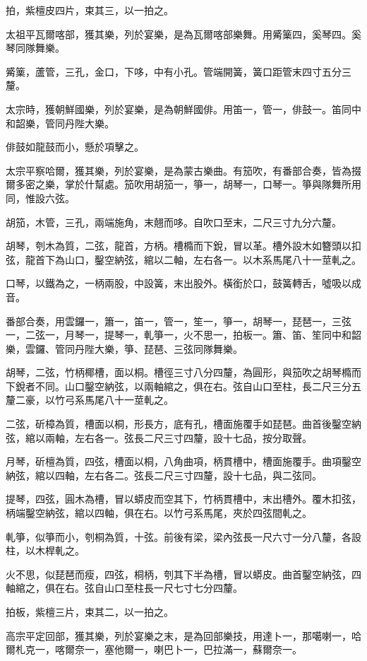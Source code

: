 \begin{pinyinscope}
拍，紫檀皮四片，束其三，以一拍之。

太祖平瓦爾喀部，獲其樂，列於宴樂，是為瓦爾喀部樂舞。用觱篥四，奚琴四。奚琴同隊舞樂。

觱篥，蘆管，三孔，金口，下哆，中有小孔。管端開簧，簧口距管末四寸五分三釐。

太宗時，獲朝鮮國樂，列於宴樂，是為朝鮮國俳。用笛一，管一，俳鼓一。笛同中和韶樂，管同丹陛大樂。

俳鼓如龍鼓而小，懸於項擊之。

太宗平察哈爾，獲其樂，列於宴樂，是為蒙古樂曲。有笳吹，有番部合奏，皆為掇爾多密之樂，掌於什幫處。笳吹用胡笳一，箏一，胡琴一，口琴一。箏與隊舞所用同，惟設六弦。

胡笳，木管，三孔，兩端施角，末翹而哆。自吹口至末，二尺三寸九分六釐。

胡琴，刳木為質，二弦，龍首，方柄。槽橢而下銳，冒以革。槽外設木如簪頭以扣弦，龍首下為山口，鑿空納弦，綰以二軸，左右各一。以木系馬尾八十一莖軋之。

口琴，以鐵為之，一柄兩股，中設簧，末出股外。橫銜於口，鼓簧轉舌，噓吸以成音。

番部合奏，用雲鑼一，簫一，笛一，管一，笙一，箏一，胡琴一，琵琶一，三弦一，二弦一，月琴一，提琴一，軋箏一，火不思一，拍板一。簫、笛、笙同中和韶樂，雲鑼、管同丹陛大樂，箏、琵琶、三弦同隊舞樂。

胡琴，二弦，竹柄椰槽，面以桐。槽徑三寸八分四釐，為圓形，與笳吹之胡琴橢而下銳者不同。山口鑿空納弦，以兩軸綰之，俱在右。弦自山口至柱，長二尺三分五釐二豪，以竹弓系馬尾八十一莖軋之。

二弦，斫樟為質，槽面以桐，形長方，底有孔，槽面施覆手如琵琶。曲首後鑿空納弦，綰以兩軸，左右各一。弦長二尺三寸四釐，設十七品，按分取聲。

月琴，斫檀為質，四弦，槽面以桐，八角曲項，柄貫槽中，槽面施覆手。曲項鑿空納弦，綰以四軸，左右各二。弦長二尺三寸四釐，設十七品，與二弦同。

提琴，四弦，圓木為槽，冒以蟒皮而空其下，竹柄貫槽中，末出槽外。覆木扣弦，柄端鑿空納弦，綰以四軸，俱在右。以竹弓系馬尾，夾於四弦間軋之。

軋箏，似箏而小，刳桐為質，十弦。前後有梁，梁內弦長一尺六寸一分八釐，各設柱，以木桿軋之。

火不思，似琵琶而瘦，四弦，桐柄，刳其下半為槽，冒以蟒皮。曲首鑿空納弦，四軸綰之，俱在右。弦自山口至柱長一尺七寸七分四釐。

拍板，紫檀三片，束其二，以一拍之。

高宗平定回部，獲其樂，列於宴樂之末，是為回部樂技，用達卜一，那噶喇一，哈爾札克一，喀爾奈一，塞他爾一，喇巴卜一，巴拉滿一，蘇爾奈一。


\end{pinyinscope}

